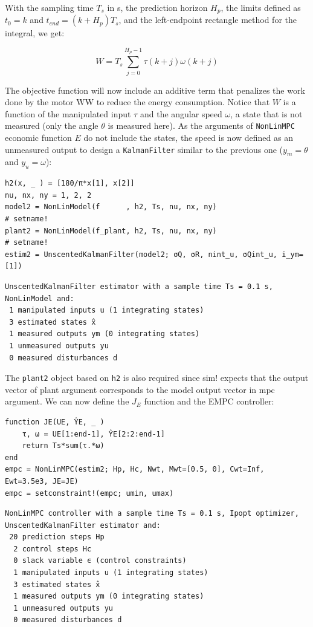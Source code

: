 With the sampling time $T_s$ in s, the prediction horizon $H_p$, the limits defined as $t_0=k$ and $t_{end} = (k + H_p) T_s$, and the left-endpoint rectangle method for the integral, we get:

\begin{equation}
W = T_s \sum_{j = 0}^{H_p - 1} \tau(k+j) \omega(k+j) 
\end{equation}

The objective function will now include an additive term that penalizes the work done by the motor WW to reduce the energy consumption. Notice that $W$ is a function of the manipulated input $\tau$ and the angular speed $\omega$, a state that is not measured (only the angle $\theta$ is measured here). As the arguments of \texttt{NonLinMPC} economic function $E$ do not include the states, the speed is now defined as an unmeasured output to design a \texttt{KalmanFilter} similar to the previous one ($ y_m = \theta$ and $y_u = \omega$):

\begin{verbatim}
h2(x, _ ) = [180/π*x[1], x[2]]
nu, nx, ny = 1, 2, 2
model2 = NonLinModel(f      , h2, Ts, nu, nx, ny)
# setname!
plant2 = NonLinModel(f_plant, h2, Ts, nu, nx, ny)
# setname!
estim2 = UnscentedKalmanFilter(model2; σQ, σR, nint_u, σQint_u, i_ym=[1])
\end{verbatim}
\spacerepl
\begin{verbatim}
UnscentedKalmanFilter estimator with a sample time Ts = 0.1 s,
NonLinModel and:
 1 manipulated inputs u (1 integrating states)
 3 estimated states x̂
 1 measured outputs ym (0 integrating states)
 1 unmeasured outputs yu
 0 measured disturbances d
\end{verbatim}

The \texttt{plant2} object based on \texttt{h2} is also required since sim! expects that the output vector of plant argument corresponds to the model output vector in mpc argument. We can now define the $J_E$ function and the EMPC controller:

\begin{verbatim}
function JE(UE, ŶE, _ )
    τ, ω = UE[1:end-1], ŶE[2:2:end-1]
    return Ts*sum(τ.*ω)
end
empc = NonLinMPC(estim2; Hp, Hc, Nwt, Mwt=[0.5, 0], Cwt=Inf, Ewt=3.5e3, JE=JE)
empc = setconstraint!(empc; umin, umax)
\end{verbatim}
\spacerepl
\begin{verbatim}
NonLinMPC controller with a sample time Ts = 0.1 s, Ipopt optimizer, UnscentedKalmanFilter estimator and:
 20 prediction steps Hp
  2 control steps Hc
  0 slack variable ϵ (control constraints)
  1 manipulated inputs u (1 integrating states)
  3 estimated states x̂
  1 measured outputs ym (0 integrating states)
  1 unmeasured outputs yu
  0 measured disturbances d
\end{verbatim}

